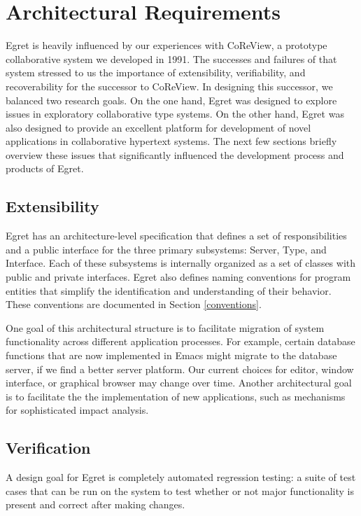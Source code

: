 \section{Architectural Requirements}

Egret is heavily influenced by our experiences with CoReView, a
prototype collaborative system we developed in 1991.  The successes
and failures of that system stressed to us the importance of
extensibility, verifiability, and recoverability for the successor to
CoReView.  In designing this successor, we balanced two research
goals.  On the one hand, Egret was designed to explore issues in
exploratory collaborative type systems.  On the other hand, Egret was
also designed to provide an excellent platform for development of
novel applications in collaborative hypertext systems.  The next few
sections briefly overview these issues that significantly influenced
the development process and products of Egret.

\subsection{Extensibility}  

Egret has an architecture-level specification that defines a set of
responsibilities and a public interface for the three primary subsystems:
Server, Type, and Interface.  Each of these subsystems is internally
organized as a set of classes with public and private interfaces.  Egret 
also defines naming conventions for program entities that simplify the
identification and understanding of their behavior.  These conventions
are documented in Section \ref{conventions}.

One goal of this architectural structure is to facilitate migration of
system functionality across different application processes.  For
example, certain database functions that are now implemented in Emacs
might migrate to the database server, if we find a better server
platform.  Our current choices for editor, window interface, or
graphical browser may change over time.  Another architectural goal is to
facilitate the the implementation of new applications, such as
mechanisms for sophisticated impact analysis.  

\subsection{Verification} 

A design goal for Egret is completely automated regression testing: a
suite of test cases that can be run on the system to test whether or
not major functionality is present and correct after making changes.

